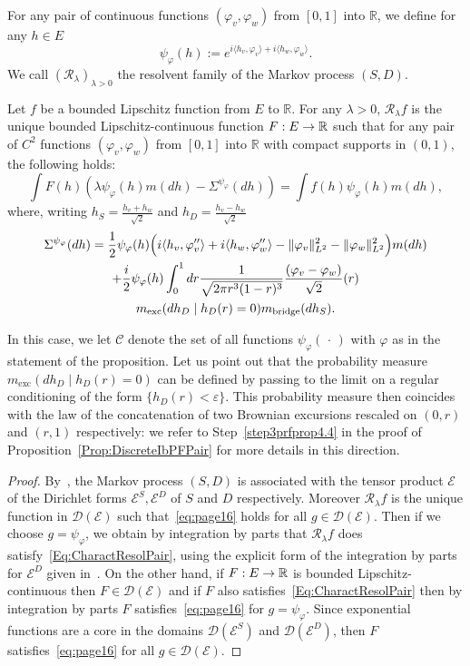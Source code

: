 \documentclass[10pt]{amsart}
\theoremstyle{definition}\newtheorem{defi}[theo]{Definition}\newtheorem{rema}[theo]{Remark}\newtheorem{exam}[theo]{Example}\newtheorem{exem}[theo]{Example}\newtheorem{nota}[theo]{Notation}
\theoremstyle{plain}
\newcommand{\cC}{\mathcal{C}}
\newcommand{\cD}{\mathcal{D}}
\newcommand{\cE}{\mathcal{E}}
\newcommand{\cR}{\mathcal{R}}
\newcommand{\R}{\mathbb{R}}
\newcommand{\mBB}{m_{\mathrm{bridge}}}
\newcommand{\mBE}{m_{\mathrm{exc}}}
\newcounter{setofstep}
\newcounter{step}[setofstep]
\renewcommand*{\to}{\mathchoice{\longrightarrow}{\rightarrow}{\rightarrow}{\rightarrow}}
\begin{document}
For any pair of continuous functions $(\varphi_v,\varphi_w)$ from $[0,1]$ into $\R$, we define for any $h\in E$
\[
\psi_\varphi(h):= e^{i \langle h_v,\varphi_v\rangle+i\langle h_w,\varphi_w\rangle}.
\]
We call $(\cR_\lambda)_{\lambda>0}$ the resolvent family of the Markov process $(S,D)$.

\begin{prop}\label{prop:Sigma2int}
Let $f$ be a bounded Lipschitz function from $E$ to $\R$. For any $\lambda > 0$, $\cR_\lambda f$ is the unique bounded Lipschitz-continuous function $F:E\to\R$ such that for any pair of $C^2$ functions $(\varphi_v,\varphi_w)$ from $[0,1]$ into $\R$ with compact supports in $(0,1)$, the following holds:
\begin{equation}\label{Eq:CharactResolPair}
\int F(h) (\lambda \psi_\varphi(h) m(dh) - \Sigma^{\psi_\varphi}(dh)) = \int f(h) \psi_\varphi(h) m(dh),
\end{equation}
where, writing $h_S=\frac{h_v+h_w}{\sqrt{2}}$ and $h_D= \frac{h_v-h_w}{\sqrt{2}}$
\begin{multline}\label{Eq:SigmaPair}
\Sigma^{\psi_\varphi}(dh) = \frac12 \psi_\varphi(h)\Bigl(i \langle h_v,\varphi''_v\rangle + i \langle h_w,\varphi''_w\rangle - \| \varphi_v\|_{L^2}^2 - \| \varphi_w\|_{L^2}^2\Bigr) m(dh)\\
+\frac{i}{2} \psi_\varphi(h)\int_0^1 dr \frac{1}{\sqrt{2\pi r^3(1-r)^3}} \frac{(\varphi_v-\varphi_w)}{\sqrt{2}}(r)\\
\mBE(dh_D \mid h_D(r) = 0)\mBB(dh_S).
\end{multline}
\end{prop}

In this case, we let $\cC$ denote the set of all functions $\psi_\varphi(\,\cdot\,)$ with $\varphi$ as in the statement of the proposition. Let us point out that the probability measure $\mBE(dh_D \mid h_D(r) = 0)$ can be defined by passing to the limit on a regular conditioning of the form $\{h_D(r) < \varepsilon\}$. This probability measure then coincides with the law of the concatenation of two Brownian excursions rescaled on $(0,r)$ and $(r,1)$ respectively: we refer to Step~\ref{step3prfprop4.4} in the proof of Proposition~\ref{Prop:DiscreteIbPFPair} for more details in this direction.

\begin{proof}
By~\cite[chapter~V]{BH91}, the Markov process $(S,D)$ is associated with the tensor product $\cE$ of the Dirichlet forms $\cE^S,\cE^D$ of $S$ and $D$ respectively. Moreover $\cR_\lambda f$ is the unique function in $\cD(\cE)$ such that~\eqref{eq:page16} holds for all $g\in\cD(\cE)$. Then if we choose $g=\psi_\varphi$, we obtain by integration by parts that $\cR_\lambda f$ does satisfy~\eqref{Eq:CharactResolPair}, using the explicit form of the integration by parts for $\cE^D$ given in~\cite{Zambotti2002}. On the other hand, if $F:E\to\R$ is bounded Lipschitz-continuous then $F\in\cD(\cE)$ and if $F$ also satisfies~\eqref{Eq:CharactResolPair} then by integration by parts $F$ satisfies~\eqref{eq:page16} for $g=\psi_\varphi$. Since exponential functions are a core in the domains $\cD(\cE^S)$ and $\cD(\cE^D)$, then $F$ satisfies~\eqref{eq:page16} for all $g\in\cD(\cE)$.
\end{proof}
\end{document}
